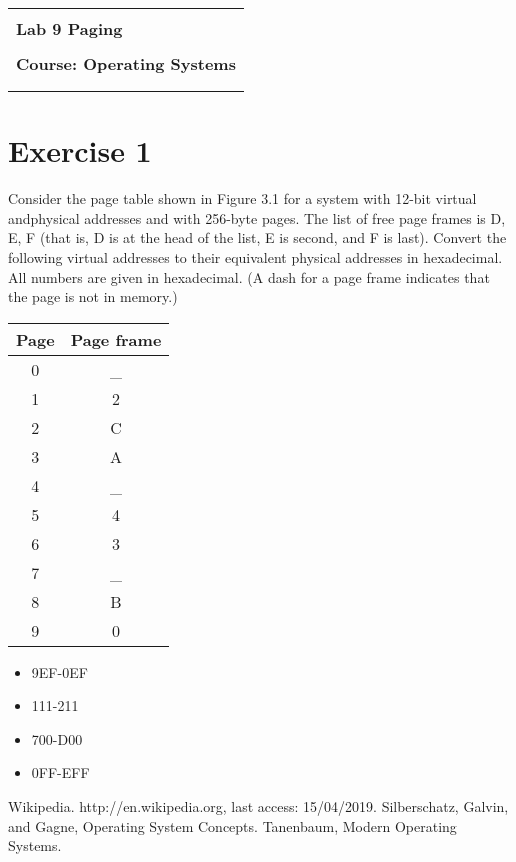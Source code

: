 \documentclass[12pt]{article}
\begin{document}
\begin{flushleft}
    \begin{tabular}{c}
        \\ \\ \hline \\
        \multicolumn{1}{l}{\textbf{{\Huge Lab 9 Paging}}}
        \\ \\
        \textbf{{\Huge Course: Operating Systems}}
        \\ \\ \hline \\
    \end{tabular}
\end{flushleft}


\vspace{0.5cm}

\section*{Exercise 1}
Consider the page table shown in Figure 3.1 for a system with 12-bit virtual andphysical addresses and with 256-byte pages. The list of free page frames is D, E, F (that is, D is at the head of the list, E is second, and F is last). Convert the following virtual addresses to their equivalent physical addresses in hexadecimal. All numbers are given in hexadecimal. (A dash for a page frame indicates that the page is not in memory.)


\begin{multicols}{3}


    \begin{tabular}{|c|c|}
    \hline
    Page & Page frame \\ \hline
    0    & \_         \\ \hline
    1    & 2          \\ \hline
    2    & C          \\ \hline
    3    & A          \\ \hline
    4    & \_         \\ \hline
    5    & 4          \\ \hline
    6    & 3          \\ \hline
    7    & \_         \\ \hline
    8    & B          \\ \hline
    9    & 0          \\ \hline
    \end{tabular}

    \begin{itemize}
        \item 9EF-0EF
        \item 111-211
        \item 700-D00
        \item 0FF-EFF
    \end{itemize}

\end{multicols}


\newpage
\begin{thebibliography}{80}
     Wikipedia. http://en.wikipedia.org, last access: 15/04/2019.
      Silberschatz, Galvin, and Gagne, Operating System Concepts.
     Tanenbaum, Modern Operating Systems.
\end{thebibliography}
\end{document}
